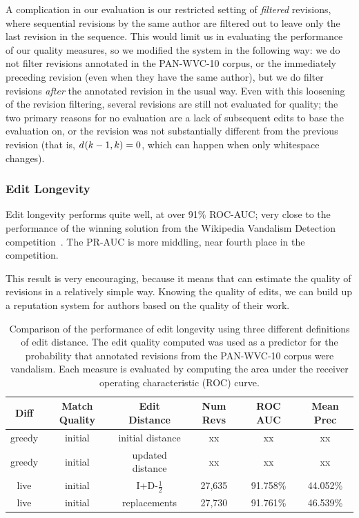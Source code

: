 A complication in our evaluation is our restricted setting of
\textit{filtered} revisions, where sequential revisions by the
same author are filtered out to leave only the last revision
in the sequence.
This would limit us in evaluating the performance of our
quality measures, so we modified the system in the following way:
we do not filter revisions annotated in the PAN-WVC-10 corpus,
or the immediately preceding revision (even when they have the
same author), but we do filter revisions \textit{after} the annotated
revision in the usual way.
Even with this loosening of the revision filtering, several
revisions are still not evaluated for quality; the two
primary reasons for no evaluation are a lack of subsequent
edits to base the evaluation on, or the revision was not
substantially different from the previous revision
(that is, $d_{}(k-1,k) = 0$, which can happen when only
whitespace changes).

\subsubsection{Edit Longevity}

Edit longevity performs quite well, at over 91\% ROC-AUC;
very close to the performance of the winning solution from
the Wikipedia Vandalism Detection competition~\cite{Potthast2010b}.
The PR-AUC is more middling, near fourth place in the competition.

This result is very encouraging, because it means that can
estimate the quality of revisions in a relatively simple way.
Knowing the quality of edits, we can build up a reputation
system for authors based on the quality of their work.


\begin{table}[tbph]
\begin{center}
\begin{tabular}{|c|c|c||c|c|c|}
\hline
Diff & Match Quality & Edit Distance & Num Revs & ROC AUC & Mean Prec \\
\hline
\hline
greedy & initial &initial distance & xx & xx & xx \\
greedy & initial &updated distance & xx & xx & xx \\
live & initial &I+D-$\frac{1}{2}$ & 27,635 & 91.758\% & 44.052\% \\
live & initial &replacements & 27,730 & 91.761\% & 46.539\% \\
\hline
\end{tabular}
\end{center}
\caption{Comparison of the performance of edit longevity
  using three different definitions of edit distance.
  The edit quality computed was used as a predictor for the probability
  that annotated revisions from the PAN-WVC-10 corpus were vandalism.
  Each measure is evaluated by computing the area under the
  receiver operating characteristic (ROC) curve.
} 
\end{table}


